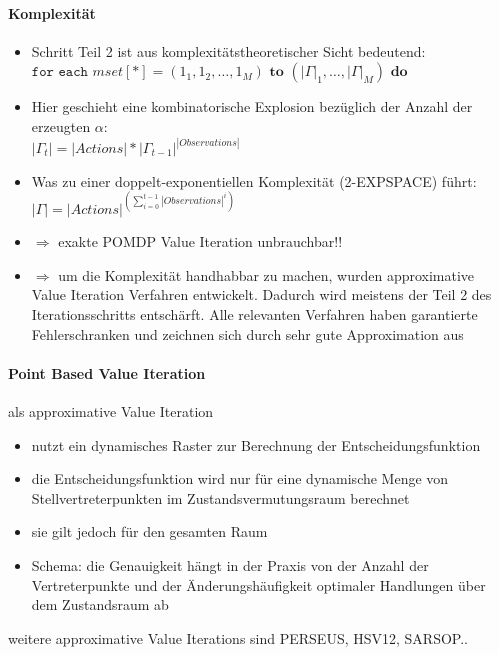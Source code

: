 \paragraph{Komplexit\"at}
\begin{itemize}
	\item Schritt Teil 2 ist aus komplexit\"atstheoretischer Sicht bedeutend:\\
	$\texttt{for each } mset\left[*\right] = (1_1, 1_2, \ldots, 1_M) \textbf{ to } (|\Gamma|_1, \ldots, |\Gamma|_M) \textbf{ do}$
	\item Hier geschieht eine kombinatorische Explosion bez\"uglich der Anzahl der erzeugten $\alpha$:\\
	$|\Gamma_t| = |Actions| * |\Gamma_{t-1}|^{|Observations|}$
	\item Was zu einer doppelt-exponentiellen Komplexit\"at (2-EXPSPACE) f\"uhrt:\\
	$|\Gamma| = |Actions|^{(\sum_{i=0}^{t-1} |Observations|^i)}$
	\item $\Rightarrow$ exakte POMDP Value Iteration unbrauchbar!!
	\item $\Rightarrow$ um die Komplexit\"at handhabbar zu machen, wurden approximative Value Iteration Verfahren entwickelt. Dadurch wird meistens der Teil 2 des Iterationsschritts entsch\"arft. Alle relevanten Verfahren haben garantierte Fehlerschranken und zeichnen sich durch sehr gute Approximation aus
\end{itemize}

\paragraph{Point Based Value Iteration} als approximative Value Iteration
\begin{itemize}
	\item nutzt ein dynamisches Raster zur Berechnung der Entscheidungsfunktion
	\item die Entscheidungsfunktion wird nur f\"ur eine dynamische Menge von Stellvertreterpunkten im Zustandsvermutungsraum berechnet
	\item sie gilt jedoch f\"ur den gesamten Raum
	\item Schema: die Genauigkeit h\"angt in der Praxis von der Anzahl der Vertreterpunkte und der \"Anderungsh\"aufigkeit optimaler Handlungen \"uber dem Zustandsraum ab
\end{itemize}

weitere approximative Value Iterations sind PERSEUS, HSV12, SARSOP..


